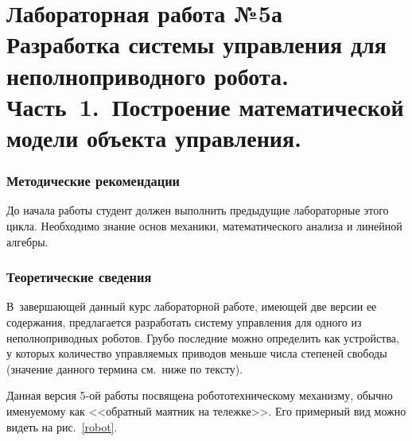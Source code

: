 \documentclass[12pt,a4paper,openany]{extarticle}
\begin{document}
\part*{Лабораторная работа №5а\\
Разработка системы управления для неполноприводного робота.\\ {\LARGE Часть~1.~Построение математической модели объекта управления.}}

\section{Методические рекомендации}
\hspace*{\parindent}До начала работы студент должен выполнить предыдущие лабораторные этого цикла. 
Необходимо знание основ механики, математического анализа и линейной алгебры.

\section{Теоретические сведения}
\hspace*{\parindent}В~завершающей данный курс лабораторной работе, имеющей две версии ее содержания, предлагается разработать систему управления для одного из неполноприводных роботов.
Грубо последние можно определить как устройства, у которых количество управляемых приводов меньше числа степеней свободы (значение данного термина см.~ниже по тексту).

Данная версия 5-ой работы посвящена робототехническому механизму, обычно именуемому как <<обратный маятник на тележке>>.
Его примерный вид можно видеть на рис.~\ref{robot}.
\end{document}
